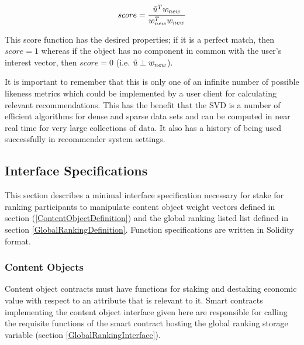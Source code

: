 \begin{equation}
    score = \frac{\Tilde{u}^Tw_{new}}{w_{new}^Tw_{new}}
\end{equation}

This score function has the desired properties; if it is a perfect match, then $score=1$ whereas if the object has no component in common with the user's interest vector, then $score = 0$ (i.e. $\Tilde{u} \perp w_{new}$).

It is important to remember that this is only one of an infinite number of possible likeness metrics which could be implemented by a user client for calculating relevant recommendations. This has the benefit that the SVD is a number of efficient algorithms for dense and sparse data sets and can be computed in near real time for very large collections of data. It also has a history of being used successfully in recommender system settings. 

\subsection{Interface Specifications}
\label{InterfaceDefinition}
This section describes a minimal interface specification necessary for stake for ranking participants to manipulate content object weight vectors defined in section (\ref{ContentObjectDefinition}) and the global ranking listed list defined in section \ref{GlobalRankingDefinition}. Function specifications are written in Solidity format.


\subsubsection{Content Objects}

Content object contracts must have functions for staking and destaking economic value with respect to an attribute that is relevant to it. Smart contracts implementing the content object interface given here are responsible for calling the requisite functions of the smart contract hosting the global ranking storage variable (section \ref{GlobalRankingInterface}). 

